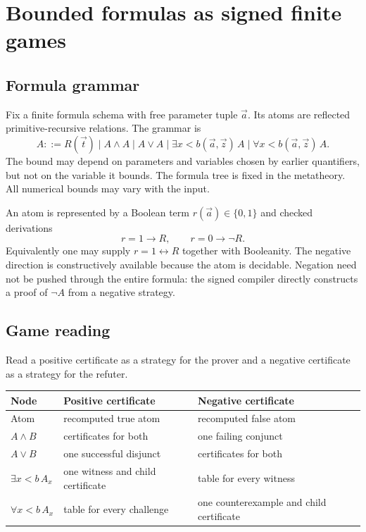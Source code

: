 \section{Bounded formulas as signed finite games}

\subsection{Formula grammar}

Fix a finite formula schema with free parameter tuple \(\vec a\).  Its atoms
are reflected primitive-recursive relations.  The grammar is
\[
 A ::= R(\vec t)\mid A\wedge A\mid A\vee A
       \mid \exists x<b(\vec a,\vec z)\,A
       \mid \forall x<b(\vec a,\vec z)\,A.
\]
The bound may depend on parameters and variables chosen by earlier quantifiers,
but not on the variable it bounds.  The formula tree is fixed in the
metatheory.  All numerical bounds may vary with the input.

An atom is represented by a Boolean term \(r(\vec a)\in\{0,1\}\) and checked
derivations
\[
 r=1\to R,\qquad r=0\to\neg R.
\]
Equivalently one may supply \(r=1\leftrightarrow R\) together with Booleanity.
The negative direction is constructively available because the atom is
decidable.  Negation need not be pushed through the entire formula: the signed
compiler directly constructs a proof of \(\neg A\) from a negative strategy.

\subsection{Game reading}

Read a positive certificate as a strategy for the prover and a negative
certificate as a strategy for the refuter.

\begin{center}
\begin{tabular}{lll}
\toprule
Node & Positive certificate & Negative certificate \\
\midrule
Atom & recomputed true atom & recomputed false atom \\
\(A\wedge B\) & certificates for both & one failing conjunct \\
\(A\vee B\) & one successful disjunct & certificates for both \\
\(\exists x<b\,A_x\) & one witness and child certificate & table for every witness \\
\(\forall x<b\,A_x\) & table for every challenge & one counterexample and child certificate \\
\bottomrule
\end{tabular}
\end{center}

